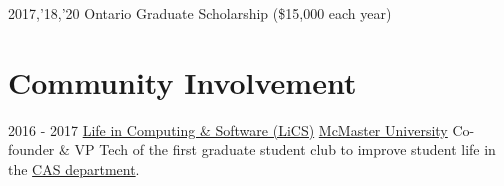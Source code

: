 \documentclass[letterpaper]{twentysecondcv} %
\begin{document}
\vspace{-.5em}
\begin{twenty}
  \twentyitem
  {2017,'18,'20}
  {}
  {Ontario Graduate Scholarship \textnormal{(\$15,000 each year)}}
	{}
	{}
	{}
%
%	
\end{twenty}

\vspace{-1.5em}
\section{Community Involvement}
\vspace{-.5em}
\begin{twenty}
	\twentyitem
	{2016 - 2017}
	{}
	{\href{https://lics.cas.mcmaster.ca/node/17}{Life in Computing \& Software (LiCS)}}
	{\href{https://www.mcmaster.ca/}{McMaster University}}
	{}
	{Co-founder \& VP Tech of the first graduate student club to improve student life in the \href{https://www.eng.mcmaster.ca/cas}{CAS department}.
  }
\end{twenty}
\end{document}
